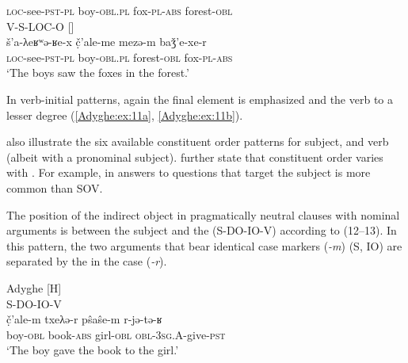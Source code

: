 \documentclass[output=paper,colorlinks,citecolor=brown, draft]{langscibook}
\begin{document}
\textsc{loc-}see\textsc{-pst}\textsc{-pl} boy\textsc{-obl.pl} fox\textsc{-pl-abs} forest\textsc{-obl} \\
\ex\label{Adyghe:ex:11b}
\textcolor{C4}{V}-\textcolor{C1}{S}-\textcolor{C3}{LOC}-\textcolor{C2}{O} [] \\
\gll \textcolor{C4}{š'a-λeʁʷə-ʁe-x} \textcolor{C1}{č̣'ale-me} \textcolor{C3}{mezə-m} \textcolor{C2}{baǯ'e-xe-r} \\ 
\textsc{loc-}see\textsc{-pst}\textsc{-pl} boy\textsc{-obl.pl} forest\textsc{-obl} fox\textsc{-pl}\textsc{-abs} \\
\glt `The boys saw the foxes in the forest.'
\z
\z

In verb-initial patterns, again the final element is emphasized and the verb to a lesser degree (\ref{Adyghe:ex:11a}, \ref{Adyghe:ex:11b}).

\citet[117]{kumakhov2009circassian} also illustrate the six available constituent order patterns for subject,  and verb (albeit with a pronominal subject). \citet[112]{kumakhov2009circassian} further state that constituent order varies with . For example, in answers to questions that target the subject  is more common than SOV.

The position of the indirect object in pragmatically neutral clauses with nominal arguments is between the subject and the  (S-DO-IO-V) according to \citet[114--115]{kumakhov2009circassian} (12--13). In this pattern, the two arguments that bear identical case markers (\textit{-m}) (S, IO) are separated by the  in the  case (\textit{-r}). 

\ea\label{Adyghe:ex:12}
Adyghe \citep[114]{kumakhov2009circassian} [H] \\
\textcolor{C1}{S}-\textcolor{C2}{DO}-\textcolor{C5}{IO}-\textcolor{C4}{V} \\
\gll \textcolor{C1}{č̣'ale-m} \textcolor{C2}{txeλə-r} \textcolor{C5}{pŝaŝe-m} \textcolor{C4}{r-jə-tə-ʁ} \\
boy\textsc{-obl} book\textsc{-abs} girl\textsc{-obl} \textsc{obl-3sg.A-}give\textsc{-pst} \\
\glt `The boy gave the book to the girl.'
\z
\end{document}

